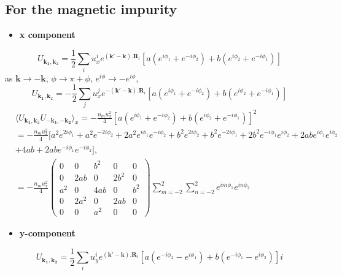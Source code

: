 \documentclass[aps,prb,amsmath,amssymb,footinbib,showpacs,twocolumn]{revtex4-2}
\begin{document}
\begin{widetext}
\subsection{For the magnetic impurity}
\begin{itemize}
    \item \textbf{x component}
\end{itemize}
\begin{equation}
    U_{\mathbf{k_1},\mathbf{k}_{2}}= \frac{1}{2}\sum_{i}u^{i}_{x}e^{(\mathbf{k'-k}).\mathbf{R}_{i}}\left[a(e^{i\phi_{1}}+e^{-i\phi_{2}})+b(e^{i\phi_{2}}+e^{-i\phi_{1}})\right]
\end{equation}
as  $\mathbf{k}\to \mathbf{-k}$, $\phi \to \pi+\phi$, $e^{i\phi}\to -e^{i\phi}$, 
\begin{equation}
     U_{\mathbf{k_1},\mathbf{k}_{2}}= -\frac{1}{2}\sum_{j}u^{j}_{x}e^{-(\mathbf{k'-k}).\mathbf{R}_{i}}\left[a(e^{i\phi_{1}}+e^{-i\phi_{2}})+b(e^{i\phi_{2}}+e^{-i\phi_{1}})\right]
\end{equation}
\begin{align}
    &\langle U_{\mathbf{k_1},\mathbf{k}_{2}}U_{\mathbf{-k_1},\mathbf{-k_2}}\bigl \rangle_{x}= -\frac{n_{m}u^{2}_{x}}{4}\left[a(e^{i\phi_{1}}+e^{-i\phi_{2}})+b(e^{i\phi_{2}}+e^{-i\phi_{1}})\right]^{2}\nonumber\\&
    = -\frac{n_{m}u^{2}_{x}}{4}[a^{2}e^{2i\phi_{1}}+a^{2}e^{-2i\phi_{2}}+2a^{2}e^{i\phi_{1}}e^{-i\phi_{2}}+b^{2}e^{2i\phi_{2}}+b^{2}e^{-2i\phi_{1}}+2b^{2}e^{-i\phi_{1}}e^{i\phi_{2}}+2abe^{i\phi_{1}}e^{i\phi_{2}}\nonumber\\&
    +4ab+2abe^{-i\phi_{1}}e^{-i\phi_{2}}], \nonumber\\&
    = -\frac{n_{m}u^{2}_{x}}{4}\begin{pmatrix}
 0 & 0 & b^{2} & 0 & 0\\
        0 & 2ab & 0 & 2b^{2} & 0 \\
        a^{2} & 0 & 4ab & 0 & b^{2} \\
        0 & 2a^{2} & 0 & 2ab & 0\\
       0 & 0 & a^{2} & 0 & 0
\end{pmatrix}\sum_{m=-2}^{2}\sum_{n=-2}^{2}e^{im\phi_{1}}e^{in\phi_{2}}
\end{align}
\begin{itemize}
    \item \textbf{y-component}
\end{itemize}
\begin{equation}
  U_{\mathbf{k_{1},k_{2}}}   = \frac{1}{2}\sum_{i}u^{i}_{y}e^{(\mathbf{k'-k}).\mathbf{R}_{i}}\left[a(e^{-i\phi_{2}}-e^{i\phi_{1}})+b(e^{-i\phi_{1}}-e^{i\phi_{2}})\right]i

\end{equation}
\end{widetext}
\end{document}
